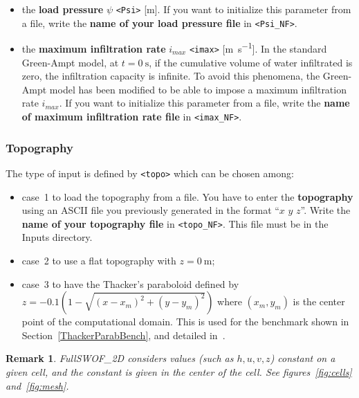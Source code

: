 \documentclass[a4paper, 11pt]{article}
\newcommand{\FullSWOF}{FullSWOF\_2D}
\newtheorem{rmk}{Remark}
\begin{document}
\begin{itemize}
\begin{itemize}
		            \newline
		            If you want to initialize this parameter from a file, write the \textbf{name of your initial water deficit file} in \texttt{<dtheta\_NF>}.
		      \item the \textbf{load pressure} \textbf{\(\psi\)} \texttt{<Psi>} [\si{\meter}].\newline
		            If you want to initialize this parameter from a file, write the \textbf{name of your load pressure file} in \texttt{<Psi\_NF>}.
		      \item the \textbf{maximum infiltration rate} \(i_{max}\) \texttt{<imax>} [\si{\meter\per\second}].
		            In the standard Green-Ampt model, at \(t=\SI{0}{\second}\), if the cumulative volume of water infiltrated is zero, the infiltration capacity is infinite.
		            To avoid this phenomena, the Green-Ampt model has been modified to be able to impose a maximum infiltration rate \(i_{max}\).
		            \newline
		            If you want to initialize this parameter from a file, write the \textbf{name of maximum infiltration rate file} in \texttt{<imax\_NF>}.
	      \end{itemize}
\end{itemize}

\subsubsection{Topography}
The type of input is defined by \texttt{<topo>} which can be chosen among:
\begin{itemize}
	\item case~1 to load the topography from a file.
	      You have to enter the \textbf{topography} using an ASCII file you previously generated in the format  ``\(x\) \(y\) \(z\)''.
	      Write the \textbf{name of your topography file} in \texttt{<topo\_NF>}.
	      This file must be in the \textsf{Inputs} directory.
	\item case~2 to use a flat topography with \(z=\SI{0}{\meter}\);
	\item case~3 to have the Thacker's paraboloid defined by \(z=-0.1(1-\sqrt{{(x-x_m)}^2+{(y-y_m)}^2})\) where \((x_m,y_m)\) is the center point of the computational domain.
	      This is used for the benchmark shown in Section~\ref{ThackerParabBench}, and detailed in~\citet[§~4.2.2]{Delestre13}.
\end{itemize}
\begin{rmk}
	\FullSWOF{} considers values (such as \(h, u, v, z\)) constant on a given cell, and the constant 	is given in the center of the cell.
	See figures~\ref{fig:cells} and~\ref{fig:mesh}.
\end{rmk}
\end{document}
